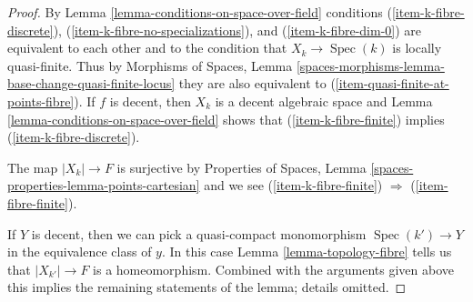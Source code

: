 \documentclass{stacks-project}
\theoremstyle{plain}
\theoremstyle{definition}
\theoremstyle{remark}
\numberwithin{equation}{subsection}
\def\Spec{\mathop{\mathrm{Spec}}}
\begin{document}
\begin{proof}
By Lemma \ref{lemma-conditions-on-space-over-field}
conditions  (\ref{item-k-fibre-discrete}),
(\ref{item-k-fibre-no-specializations}), and (\ref{item-k-fibre-dim-0})
are equivalent to each other and to the condition that
$X_k \to \Spec(k)$ is locally quasi-finite.
Thus by Morphisms of Spaces, Lemma
\ref{spaces-morphisms-lemma-base-change-quasi-finite-locus}
they are also equivalent to (\ref{item-quasi-finite-at-points-fibre}).
If $f$ is decent, then $X_k$ is a decent algebraic space and
Lemma \ref{lemma-conditions-on-space-over-field}
shows that (\ref{item-k-fibre-finite}) implies (\ref{item-k-fibre-discrete}).

\medskip\noindent
The map $|X_k| \to F$ is surjective by
Properties of Spaces, Lemma \ref{spaces-properties-lemma-points-cartesian}
and we see
(\ref{item-k-fibre-finite}) $\Rightarrow$ (\ref{item-fibre-finite}).

\medskip\noindent
If $Y$ is decent, then we can pick a quasi-compact monomorphism
$\Spec(k') \to Y$ in the equivalence class of $y$. In this case
Lemma \ref{lemma-topology-fibre}
tells us that $|X_{k'}| \to F$ is a homeomorphism.
Combined with the arguments given above this implies
the remaining statements of the lemma; details omitted.
\end{proof}
\end{document}
